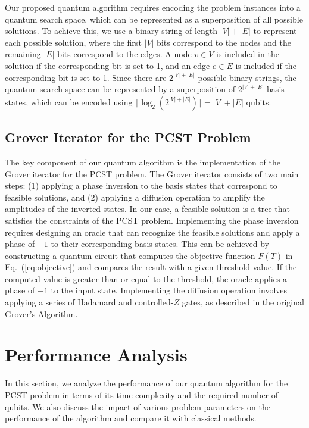 Our proposed quantum algorithm requires encoding the problem instances into a quantum search space, which can be represented as a superposition of all possible solutions. To achieve this, we use a binary string of length $|V| + |E|$ to represent each possible solution, where the first $|V|$ bits correspond to the nodes and the remaining $|E|$ bits correspond to the edges. A node $v \in V$ is included in the solution if the corresponding bit is set to 1, and an edge $e \in E$ is included if the corresponding bit is set to 1. Since there are $2^{|V|+|E|}$ possible binary strings, the quantum search space can be represented by a superposition of $2^{|V|+|E|}$ basis states, which can be encoded using $\lceil \log_2 (2^{|V|+|E|}) \rceil = |V| + |E|$ qubits.

\subsection{Grover Iterator for the PCST Problem}

The key component of our quantum algorithm is the implementation of the Grover iterator for the PCST problem. The Grover iterator consists of two main steps: (1) applying a phase inversion to the basis states that correspond to feasible solutions, and (2) applying a diffusion operation to amplify the amplitudes of the inverted states. In our case, a feasible solution is a tree that satisfies the constraints of the PCST problem. Implementing the phase inversion requires designing an oracle that can recognize the feasible solutions and apply a phase of $-1$ to their corresponding basis states. This can be achieved by constructing a quantum circuit that computes the objective function $F(T)$ in Eq.~(\ref{eq:objective}) and compares the result with a given threshold value. If the computed value is greater than or equal to the threshold, the oracle applies a phase of $-1$ to the input state. Implementing the diffusion operation involves applying a series of Hadamard and controlled-$Z$ gates, as described in the original Grover's Algorithm.

\section{Performance Analysis}
\label{sec:analysis}

In this section, we analyze the performance of our quantum algorithm for the PCST problem in terms of its time complexity and the required number of qubits. We also discuss the impact of various problem parameters on the performance of the algorithm and compare it with classical methods.

